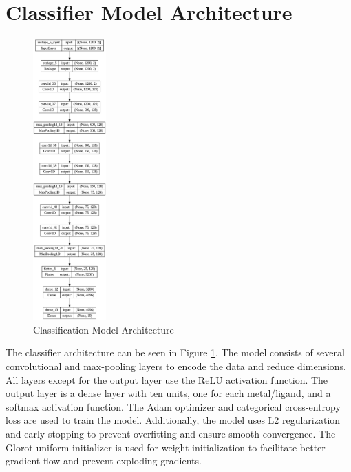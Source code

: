 \section{Classifier Model Architecture}
\begin{figure}[!h]
  \centering
    \includegraphics[width=0.25\textwidth]{figures/model_architecture.png}
    \caption{Classification Model Architecture}
    \label{model_arch}
\end{figure}
The classifier architecture can be seen in Figure \ref{model_arch}. The model consists of several convolutional and max-pooling layers to encode the data and reduce dimensions. All layers except for the output layer use the ReLU activation function. The output layer is a dense layer with ten units, one for each metal/ligand, and a softmax activation function. The Adam optimizer and categorical cross-entropy loss are used to train the model. Additionally, the model uses L2 regularization and early stopping to prevent overfitting and ensure smooth convergence. The Glorot uniform initializer is used for weight initialization to facilitate better gradient flow and prevent exploding gradients. 
